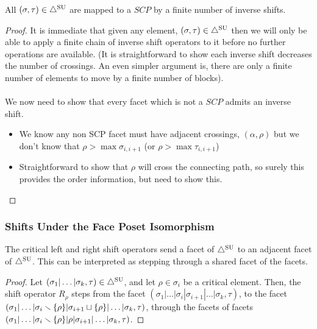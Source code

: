 \begin{lemma}\label{lem:inductive decomposition into SCP}
All $(\sigma,\tau)\in \triangle^{\mathrm{SU}}$ are mapped to a $SCP$ by a finite number of inverse shifts.
\end{lemma}
\begin{proof}
It is immediate that given any element, $(\sigma,\tau) \in \triangle^{\mathrm{SU}}$ then we will only be able to apply a finite chain of inverse shift operators to it before no further operations are available. (It is straightforward to show each inverse shift decreases the number of crossings. An even simpler argument is, there are only a finite number of elements to move by a finite number of blocks).
\\\\
We now need to show that every facet which is not a $SCP$ admits an inverse shift. 
\begin{itemize}
    \item We know any non SCP facet must have adjacent crossings, $(\alpha,\rho)$ but we don't know that $\rho > \max \sigma_{i,i+1}$ (or $\rho > \max \tau_{i,i+1}$)
    \item Straightforward to show that $\rho$ will cross the connecting path, so surely this provides the order information, but need to show this. 
\end{itemize}
\end{proof}

\subsubsection{Shifts Under the Face Poset Isomorphism}

\begin{lemma}
The critical left and right shift operators send a facet of $\triangle^{\mathrm{SU}}$ to an adjacent facet of $\triangle^{\mathrm{SU}}$. This can be interpreted as stepping through a shared facet of the facets.
\end{lemma}
\begin{proof}
Let $(\sigma_1|\dots|\sigma_k,\tau) \in \triangle^{\mathrm{SU}}$, and let $\rho \in \sigma_{i}$ be a critical element. Then, the shift operator $R_{\rho}$ steps from the facet $(\sigma_1|\dots|\sigma_i |\sigma_{i+1} |\dots|\sigma_k, \tau)$, to the facet $(\sigma_1|\dots|\sigma_i \smallsetminus \{\rho\}|\sigma_{i+1} \sqcup \{\rho\}|\dots|\sigma_k,\tau)$, through the facets of facets $(\sigma_1|\dots|\sigma_i \smallsetminus \{\rho\}|\rho|\sigma_{i+1}|\dots|\sigma_k, \tau)$.
\end{proof}

